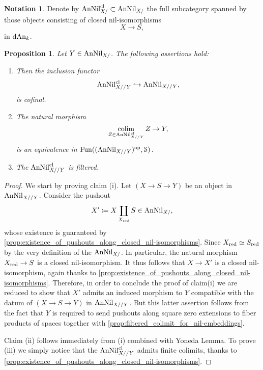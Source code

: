 \documentclass[10pt,a4paper,reqno]{amsart} %
\theoremstyle{plain}
\newtheorem{prop}[thm]{Proposition}
\theoremstyle{definition}
\newtheorem{notation}[thm]{Notation}
\theoremstyle{remark}
\numberwithin{equation}{section}
\begin{document}
\begin{notation}
    Denote by $\mathrm{AnNil}_{X/}^{\mathrm{cl}} \subset \mathrm{AnNil}_{X/}$ the full subcategory spanned by those objects consisting of closed nil-isomorphisms
        \[
            X \to S,  
        \]
    in $\mathrm{dAn}_k$.
\end{notation}

\begin{prop} \label{prop:analytic_FMP_under_X_are_ind_inf_schemes}
    Let $Y \in \mathrm{AnNil}_{X/}$. The following assertions hold:
    \begin{enumerate}
        \item Then the inclusion functor
            \[
              \mathrm{AnNil}^{\mathrm{cl}}_{X//Y} \hookrightarrow \mathrm{AnNil}_{X//Y} , 
            \]
        is cofinal.
        \item The natural morphism
            \[
               \operatorname*{colim}_{Z \in \mathrm{AnNil}_{X//Y}^{\mathrm{cl}}} Z \to Y,  
            \]
        is an equivalence in $\operatorname{Fun}((\mathrm{AnNil}_{X//Y})^\mathrm{op}, \mathcal S)$.
        \item The \infcat $\mathrm{AnNil}_{X//Y}^{\mathrm{cl}}$ is filtered.
    \end{enumerate}
\end{prop}

\begin{proof}
    We start by proving claim (i). Let $(X \to S \to Y)$ be an object in $\mathrm{AnNil}_{X//Y}$. Consider the pushout
        \[
            X' \coloneqq X \coprod_{X_{\mathrm{red}}} S \in \mathrm{AnNil}_{X/},  
        \]
    whose existence is guaranteed by \cref{prop:existence_of_pushouts_along_closed_nil-isomorphisms}. Since $X_{\mathrm{red}} \simeq S_{\mathrm{red}}$ by the very
    definition of the \infcat $\mathrm{AnNil}_{X/}$. In particular, the natural morphism $X_{\mathrm{red}} \to S$ is a closed nil-isomorphism.
    It thus follows that $X \to X'$ is a closed nil-isomorphism, again thanks to \cref{prop:existence_of_pushouts_along_closed_nil-isomorphisms}.
    Therefore, in order to conclude the proof of claim(i) we are reduced to show that $X'$ admits an induced morphism to $Y$ compatible with the datum
    of $(X \to S \to Y)$ in $\mathrm{AnNil}_{X//Y}$. But this latter assertion follows from the fact that $Y$ is required to send pushouts along square zero extensions
    to fiber products of spaces together with \cref{prop:filtered_colimit_for_nil-embeddings}.

    Claim (ii) follows immediately from (i) combined with Yoneda Lemma. To prove (iii) we simply notice that the \infcat $\mathrm{AnNil}^{\mathrm{cl}}_{X//Y}$ admits
    finite colimits, thanks to \cref{prop:existence_of_pushouts_along_closed_nil-isomorphisms}.
\end{proof}
\end{document}
